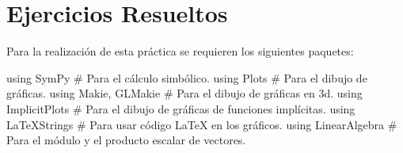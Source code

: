 \documentclass[
  a4paper,
]{scrreport}
\newenvironment{Shaded}{\begin{snugshade}}{\end{snugshade}}
\newcommand{\BuiltInTok}[1]{\textcolor[rgb]{0.00,0.23,0.31}{#1}}
\newcommand{\CommentTok}[1]{\textcolor[rgb]{0.37,0.37,0.37}{#1}}
\newcommand{\ImportTok}[1]{\textcolor[rgb]{0.00,0.46,0.62}{#1}}
\newcommand{\NormalTok}[1]{\textcolor[rgb]{0.00,0.23,0.31}{#1}}
\theoremstyle{definition}
\theoremstyle{remark}
\begin{document}
\section{Ejercicios Resueltos}\label{ejercicios-resueltos-7}

Para la realización de esta práctica se requieren los siguientes
paquetes:

\begin{Shaded}
\begin{Highlighting}[]
\ImportTok{using} \BuiltInTok{SymPy}  \CommentTok{\# Para el cálculo simbólico.}
\ImportTok{using} \BuiltInTok{Plots}  \CommentTok{\# Para el dibujo de gráficas.}
\ImportTok{using} \BuiltInTok{Makie}\NormalTok{, }\BuiltInTok{GLMakie} \CommentTok{\# Para el dibujo de gráficas en 3d.}
\ImportTok{using} \BuiltInTok{ImplicitPlots} \CommentTok{\# Para el dibujo de gráficas de funciones implícitas.}
\ImportTok{using} \BuiltInTok{LaTeXStrings}  \CommentTok{\# Para usar código LaTeX en los gráficos.}
\ImportTok{using} \BuiltInTok{LinearAlgebra} \CommentTok{\# Para el módulo y el producto escalar de vectores.}
\end{Highlighting}
\end{Shaded}
\end{document}
